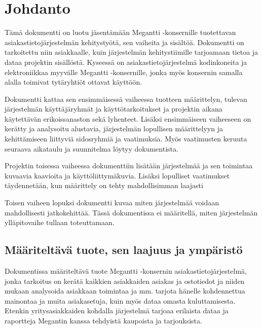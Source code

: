 \chapter{Johdanto} %
\label{johdanto} %
\thispagestyle{fancy} %


    Tämä dokumentti on luotu jäsentämään Megantti -konsernille tuotettavan asiakastietojärjestelmän kehitystyötä, sen vaiheita ja 
    sisältöä. Dokumentti on tarkoitettu niin asiakkaalle, kuin järjestelmän kehitystiimille tarjoamaan tietoa ja dataa projektin
    sisällöstä. Kyseessä on asiakastietojärjestelmä kodinkoneita ja elektroniikkaa myyvälle Megantti -konsernille, jonka myös 
    konsernin samalla alalla toimivat tytäryhtiöt ottavat käyttöön. 

    Dokumentti kattaa sen ensimmäisessä vaiheessa tuotteen määrittelyn, tulevan järjestelmän käyttäjäryhmät ja käyttötarkoitukset
    ja projektin aikana käytettävän erikoissanaston sekä lyhenteet. Lisäksi ensimmäiseen vaiheeseen on kerätty ja analysoitu alustavia,
    järjestelmän lopullisen määrittelyyn ja kehittämiseen liittyviä sidosryhmiä ja vaatimuksia. Myös vaatimusten keruuta seuraava
    aikataulu ja suunnitelma löytyy dokumentista.

    Projektin toisessa vaiheessa dokumenttiin lisätään järjestelmää ja sen toimintaa kuvaavia kaavioita ja käyttöliittymäkuvia. 
    Lisäksi lopulliset vaatimukset täyden\-netään, kun määrittely on tehty mahdollisimman laajasti

    Toisen vaiheen lopuksi dokumentti kuvaa miten järjestelmää voidaan mahdollisesti jatkokehittää.
    Tässä dokumentissa ei määritellä, miten järjestelmän ylläpitovaihe tullaan toteuttamaan.


\section{Määriteltävä tuote, sen laajuus ja ympäristö}

    Dokumentissa määriteltävä tuote Megantti -konsernin asiakastietojärjestelmä, jonka tarkoitus on kerätä kaikkien asiakkaiden asiakas
    ja ostotiedot ja niiden mukaan analysoida asiakkaan toimintaa ja mm. tarjota hänelle kohdennettua mainontaa ja muita asiakasetuja, 
    kuin myös dataa omasta kuluttamisesta. Etenkin yritysasiakkaiden kohdalla järjestelmä tarjoaa erilaista dataa ja raportteja Megantin 
    kanssa tehdyistä kaupoista ja tarjouksista. 

